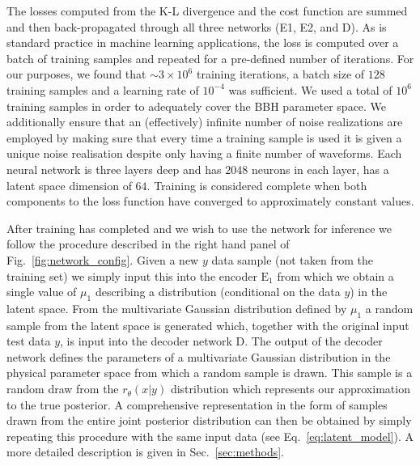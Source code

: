 \documentclass[%
showpacs,
 amsmath,amssymb,
 aps,
 twocolumn,
 prl,
 reprint,
floatfix,
]{revtex4-1}
\begin{document}
%
%
The losses computed from the K-L divergence and the cost function are summed
and then back-propagated through all three networks (E1, E2, and D).  As is
standard practice in machine learning applications, the loss is computed over a
batch of training samples and repeated for a pre-defined number of iterations.
For our purposes, we found that $\sim3\times10^6$ training iterations, a batch
size of $128$ training samples and a learning rate of $10^{-4}$ was sufficient.
We used a total of $10^6$ training samples in order to adequately cover the
\ac{BBH} parameter space.  We additionally ensure that an (effectively)
infinite number of noise realizations are employed by making sure that every
time a training sample is used it is given a unique noise realisation despite
only having a finite number of waveforms. Each neural network is three layers
deep and has $2048$ neurons in each layer, has a latent space dimension of $64$. 
Training is considered complete when
both components to the loss function have converged to approximately constant
values.

%
%
After training has completed and we wish to use the network for inference we
follow the procedure described in the right hand panel of
Fig.~\ref{fig:network_config}. Given a new $y$ data sample (not taken from the
training set) we simply input this into the encoder $\textrm{E}_1$ from which we
obtain a single value of $\mu_{1}$ describing a distribution (conditional on the
data $y$) in the latent space. From the multivariate Gaussian distribution
defined by $\mu_{1}$ a random sample from the latent space is generated which,
together with the original input test data $y$, is input into the decoder
network D. The output of the decoder network defines the parameters of a
multivariate Gaussian distribution in the physical parameter space from which a
random sample is drawn. This sample is a random draw from the $r_{\theta}(x|y)$
distribution which represents our approximation to the true posterior. A
comprehensive representation in the form of samples drawn from the entire joint
posterior distribution can then be obtained by simply repeating this procedure
with the same input data (see Eq.~\ref{eq:latent_model}). A more detailed
description is given in Sec.~\ref{sec:methods}.
\end{document}
